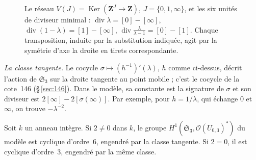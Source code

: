 \begin{figure}[htbp]
\centering
{}
\caption{Le réseau $V(J) = \operatorname{Ker}(\mathbf Z^J \to \mathbf Z)$, $J = \{0, 1, \infty\}$, et les six unités de diviseur minimal : $\operatorname{div} \lambda = [0] - [\infty]$, $\operatorname{div}(1 - \lambda) = [1] - [\infty]$, $\operatorname{div} \frac{\lambda}{\lambda - 1} = [0] - [1]$. Chaque transposition, induite par la substitution indiquée, agit par la symétrie d'axe la droite en tirets correspondante.}
\label{fig:140-1-reseau}
\end{figure}


\noindent\emph{La classe tangente.} Le cocycle $\sigma \mapsto (h^{-1})'(\lambda)$, $h$ comme ci-dessus, décrit l'action de $\mathfrak S_3$ sur la droite tangente au point mobile ; c'est le cocycle de la cote~146 (§\,\ref{sec:146}). Dans le modèle, sa constante est la signature de $\sigma$ et son diviseur est $2[\infty] - 2[\sigma(\infty)]$. Par exemple, pour $h = 1/\lambda$, qui échange $0$ et $\infty$, on trouve $-\lambda^{-2}$.

\begin{encadre}
\begin{theoreme}\label{thm:140-1-valeur}
Soit $k$ un anneau intègre. Si $2 \neq 0$ dans $k$, le groupe $H^1(\mathfrak S_3, \mathcal O(U_{0,3})^*)$ du modèle est cyclique d'ordre~$6$, engendré par la classe tangente. Si $2 = 0$, il est cyclique d'ordre~$3$, engendré par la même classe.
\end{theoreme}
\end{encadre}

